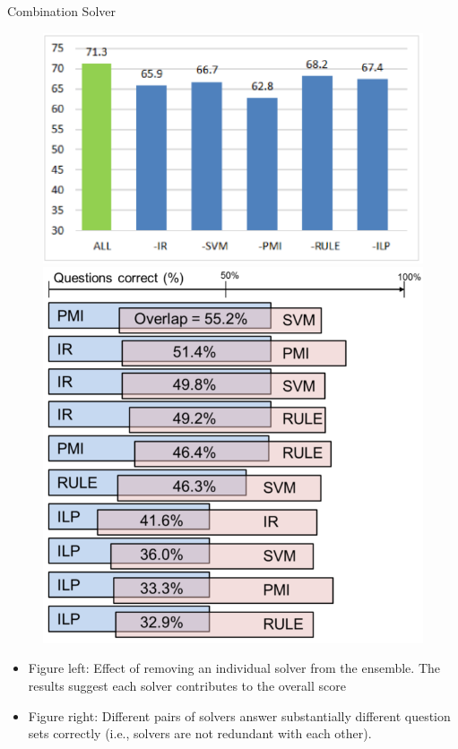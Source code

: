 \documentclass[final]{beamer}
\newlength{\onecolwid}
\begin{document}
\begin{frame}[t]
\begin{columns}[t]
\begin{column}{\onecolwid}
\begin{block}{Combination Solver}
\begin{figure}
	\includegraphics[scale=0.9]{ablation.png}
	\hspace{0.5cm}
	\includegraphics[scale=0.9]{solverPairs.png}
\end{figure}

\begin{itemize}
	\item Figure left: Effect of removing an individual solver from the ensemble. The results suggest each solver contributes to the overall score 
	\item Figure right: Different pairs of solvers answer substantially different question sets correctly (i.e., solvers are not redundant with each other).
\end{itemize}


\end{block}
\end{column}
\end{columns}
\end{frame}
\end{document}
